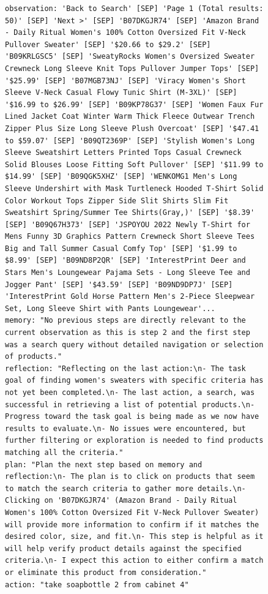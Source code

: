 \documentclass[../../main.tex]{subfiles}
\begin{document}
\begin{figure}[htbp]
\begin{tcolorbox}[
    title=\textbf{Error Type - Over Simplification},
    colback=orange!1!white,
    colframe=orange!50!black,
    fonttitle=\bfseries,
    enhanced jigsaw,
    breakable
]
\begin{Verbatim}[breaklines=true, breakanywhere=true]
observation: 'Back to Search' [SEP] 'Page 1 (Total results: 50)' [SEP] 'Next >' [SEP] 'B07DKGJR74' [SEP] 'Amazon Brand - Daily Ritual Women's 100% Cotton Oversized Fit V-Neck Pullover Sweater' [SEP] '$20.66 to $29.2' [SEP] 'B09KRLGSC5' [SEP] 'SweatyRocks Women's Oversized Sweater Crewneck Long Sleeve Knit Tops Pullover Jumper Tops' [SEP] '$25.99' [SEP] 'B07MGB73NJ' [SEP] 'Viracy Women's Short Sleeve V-Neck Casual Flowy Tunic Shirt (M-3XL)' [SEP] '$16.99 to $26.99' [SEP] 'B09KP78G37' [SEP] 'Women Faux Fur Lined Jacket Coat Winter Warm Thick Fleece Outwear Trench Zipper Plus Size Long Sleeve Plush Overcoat' [SEP] '$47.41 to $59.07' [SEP] 'B09QT2369P' [SEP] 'Stylish Women's Long Sleeve Sweatshirt Letters Printed Tops Casual Crewneck Solid Blouses Loose Fitting Soft Pullover' [SEP] '$11.99 to $14.99' [SEP] 'B09QGK5XHZ' [SEP] 'WENKOMG1 Men's Long Sleeve Undershirt with Mask Turtleneck Hooded T-Shirt Solid Color Workout Tops Zipper Side Slit Shirts Slim Fit Sweatshirt Spring/Summer Tee Shirts(Gray,)' [SEP] '$8.39' [SEP] 'B09Q67H373' [SEP] 'JSPOYOU 2022 Newly T-Shirt for Mens Funny 3D Graphics Pattern Crewneck Short Sleeve Tees Big and Tall Summer Casual Comfy Top' [SEP] '$1.99 to $8.99' [SEP] 'B09ND8P2QR' [SEP] 'InterestPrint Deer and Stars Men's Loungewear Pajama Sets - Long Sleeve Tee and Jogger Pant' [SEP] '$43.59' [SEP] 'B09ND9DP7J' [SEP] 'InterestPrint Gold Horse Pattern Men's 2-Piece Sleepwear Set, Long Sleeve Shirt with Pants Loungewear'...
memory: "No previous steps are directly relevant to the current observation as this is step 2 and the first step was a search query without detailed navigation or selection of products."
reflection: "Reflecting on the last action:\n- The task goal of finding women's sweaters with specific criteria has not yet been completed.\n- The last action, a search, was successful in retrieving a list of potential products.\n- Progress toward the task goal is being made as we now have results to evaluate.\n- No issues were encountered, but further filtering or exploration is needed to find products matching all the criteria."
plan: "Plan the next step based on memory and reflection:\n- The plan is to click on products that seem to match the search criteria to gather more details.\n- Clicking on 'B07DKGJR74' (Amazon Brand - Daily Ritual Women's 100% Cotton Oversized Fit V-Neck Pullover Sweater) will provide more information to confirm if it matches the desired color, size, and fit.\n- This step is helpful as it will help verify product details against the specified criteria.\n- I expect this action to either confirm a match or eliminate this product from consideration."
action: "take soapbottle 2 from cabinet 4"
\end{Verbatim}


\end{tcolorbox}
\end{figure}
\end{document}
